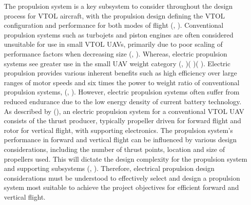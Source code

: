 The propulsion system is a key subsystem to consider throughout the design process for VTOL aircraft, with the propulsion design defining the VTOL configuration and performance for both modes of flight (\citeauthor{RN15}, \citeyear{RN15}). Conventional propulsion systems such as turbojets and piston engines are often considered unsuitable for use in small VTOL UAVs, primarily due to poor scaling of performance factors when decreasing size (\citeauthor{moore2014misconceptions}, \citeyear{moore2014misconceptions}). Whereas, electric propulsion systems see greater use in the small UAV weight category (\citeauthor{rothhaar2014nasa}, \citeyear{rothhaar2014nasa})( \citeauthor{Mugin} \citeyear{Mugin})(\citeauthor{RN8} \citeyear{RN8}). Electric propulsion provides various inherent benefits such as high efficiency over large ranges of motor speeds and six times the power to weight ratio of conventional propulsion systems, (\citeauthor{moore2014misconceptions}, \citeyear{moore2014misconceptions}). However, electric propulsion systems often suffer from reduced endurance due to the low energy density of current battery technology.  As described by \citeauthor{dundar2020design} (\citeyear{dundar2020design}), an electric propulsion system for a conventional VTOL UAV consists of the thrust producer, typically propeller driven for forward flight and rotor for vertical flight, with supporting electronics. The propulsion system’s performance in forward and vertical flight can be influenced by various design considerations, including the number of thrust points, location and size of propellers used. This will dictate the design complexity for the propulsion system and supporting subsystems (\citeauthor{cetinsoy2012design}, \citeyear{cetinsoy2012design}). Therefore, electrical propulsion design considerations must be understood to effectively select and design a propulsion system most suitable to achieve the project objectives for efficient forward and vertical flight. \\

